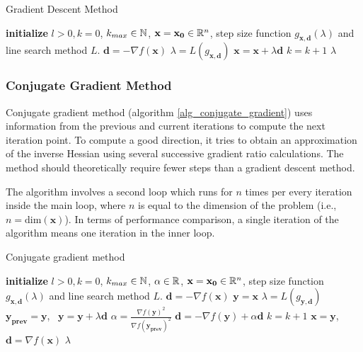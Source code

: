 \documentclass[english, 12pt, a4paper, sci, utf8, a-1b, online, table]{aaltothesis}
\newcommand{\vect}[1]{\ensuremath{\mathbf{#1}}}
\newcommand{\norm}[1]{\ensuremath\Vert #1 \Vert}
\newcommand{\R}{\ensuremath\mathbb{R}}
\newcommand{\N}{\ensuremath\mathbb{N}}
\begin{document}
\begin{algorithm}[H]
\caption{Gradient Descent Method}
\label{alg_gradient_descent}
\begin{algorithmic}[1]
\STATE \textbf{initialize} $l > 0, k = 0$, $k_{max} \in \N$, $\vect{x} = \vect{x_0} \in \R^n$, step size function $g_{\vect{x}, \vect{d}}(\lambda)$ and line search method $L$.
\WHILE{$\norm{\nabla f(\vect{x})} > l$ \AND $k < k_{max}$}
    \STATE $\vect{d} = -\nabla f(\vect{x})$
    \STATE $\lambda = L(g_{\vect{x}, \vect{d}})$
    \STATE $\vect{x} = \vect{x} + \lambda \vect{d}$
    \STATE $k = k + 1$
\ENDWHILE
\RETURN $\lambda$
\end{algorithmic}
\end{algorithm}


\subsubsection{Conjugate Gradient Method}


Conjugate gradient method (algorithm \ref{alg_conjugate_gradient}) uses information from the previous and current iterations to compute the next iteration point. To compute a good direction, it tries to obtain an approximation of the inverse Hessian using several successive gradient ratio calculations. The method should theoretically require fewer steps than a gradient descent method. \cite{book:introduction_continuous_optimization}

The algorithm involves a second loop which runs for $n$ times per every iteration inside the main loop, where $n$ is equal to the dimension of the problem (i.e., $n = \mathrm{dim}(\vect{x})$). In terms of performance comparison, a single iteration of the algorithm means one iteration in the inner loop.

\begin{algorithm}[H]
\caption{Conjugate gradient method}
\label{alg_conjugate_gradient}
\begin{algorithmic}[1]
\STATE \textbf{initialize} $l > 0, k = 0$, $k_{max} \in \N$, $\alpha \in \R$, $\vect{x} = \vect{x_0} \in \R^n$, step size function $g_{\vect{x}, \vect{d}}(\lambda)$ and line search method $L$.
\STATE $\vect{d} = -\nabla f(\vect{x})$
\WHILE{$\norm{\nabla f(\vect{x})} > l$ \AND $k < k_{max}$}
    \STATE $\vect{y} = \vect{x}$
        \STATE $\lambda = L(g_{\vect{y}, \vect{d}})$
        \STATE $\vect{y_{prev}} = \vect{y}$, \ $\vect{y} = \vect{y} + \lambda \vect{d}$
        \STATE $\alpha = \frac{\nabla f(\vect{y})^2}{\nabla f(\vect{y_{prev}})^2}$
        \STATE $\vect{d} = -\nabla f(\vect{y}) + \alpha \vect{d}$
        \STATE $k = k + 1$
    \ENDFOR
    \STATE $\vect{x} = \vect{y}$, \ $\vect{d} = \nabla f(\vect{x})$
\ENDWHILE
\RETURN $\lambda$
\end{algorithmic}
\end{algorithm}
\end{document}
